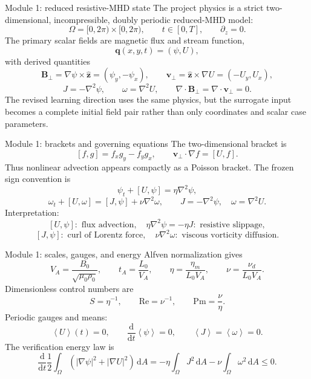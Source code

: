 \documentclass[aspectratio=169,11pt]{beamer}
\newcommand{\bracket}[2]{\left[#1,#2\right]}
\newcommand{\dd}{\,\mathrm{d}}
\newcommand{\avg}[1]{\left\langle #1\right\rangle}
\newcommand{\vect}[1]{\bm{#1}}
\newcommand{\OmegaD}{\Omega=[0,2\pi)\times[0,2\pi)}
\newcommand{\currentmodule}{Module 1}
\newcommand{\moduleprogress}{1 of 4}
\newcommand{\setmodule}[2]{%
  \renewcommand{\currentmodule}{#1}%
  \renewcommand{\moduleprogress}{#2}%
}
\begin{document}

\setmodule{Module 1}{1 of 4}
\begin{frame}[t]{Module 1: reduced resistive-MHD state}
\vspace{-0.15em}
The project physics is a strict two-dimensional, incompressible, doubly periodic reduced-MHD model:
\[
\OmegaD,\qquad t\in[0,T],\qquad \partial_z=0.
\]
The primary scalar fields are magnetic flux and stream function,
\[
\vect q(x,y,t)=(\psi,U),
\]
with derived quantities
\[
\vect B_\perp=\nabla\psi\times\widehat{\vect z}=(\psi_y,-\psi_x),\qquad
\vect v_\perp=\widehat{\vect z}\times\nabla U=(-U_y,U_x),
\]
\[
J=-\nabla^2\psi,\qquad \omega=\nabla^2U,
\qquad \nabla\cdot\vect B_\perp=\nabla\cdot\vect v_\perp=0.
\]
The revised learning direction uses the same physics, but the surrogate input becomes a complete initial field pair rather than only coordinates and scalar case parameters.
\end{frame}

\setmodule{Module 1}{2 of 4}
\begin{frame}[t]{Module 1: brackets and governing equations}
\vspace{-0.15em}
The two-dimensional bracket is
\[
\bracket{f}{g}=f_xg_y-f_yg_x,
\qquad
\vect v_\perp\cdot\nabla f=\bracket{U}{f}.
\]
Thus nonlinear advection appears compactly as a Poisson bracket. The frozen sign convention is
\[
\boxed{\psi_t+\bracket{U}{\psi}=\eta\nabla^2\psi,}
\]
\[
\boxed{\omega_t+\bracket{U}{\omega}=\bracket{J}{\psi}+\nu\nabla^2\omega,}
\qquad
J=-\nabla^2\psi,
\quad
\omega=\nabla^2U.
\]
Interpretation:
\[
\bracket{U}{\psi}:\text{ flux advection},\quad
\eta\nabla^2\psi=-\eta J:\text{ resistive slippage},
\]
\[
\bracket{J}{\psi}:\text{ curl of Lorentz force},\quad
\nu\nabla^2\omega:\text{ viscous vorticity diffusion}.
\]
\end{frame}

\setmodule{Module 1}{3 of 4}
\begin{frame}[t]{Module 1: scales, gauges, and energy}
\vspace{-0.15em}
Alfven normalization gives
\[
V_A=\frac{B_0}{\sqrt{\mu_0\rho_0}},
\qquad
 t_A=\frac{L_0}{V_A},
\qquad
\eta=\frac{\eta_m}{L_0V_A},
\qquad
\nu=\frac{\nu_d}{L_0V_A}.
\]
Dimensionless control numbers are
\[
S=\eta^{-1},\qquad \mathrm{Re}=\nu^{-1},\qquad \mathrm{Pm}=\frac{\nu}{\eta}.
\]
Periodic gauges and means:
\[
\avg{U}(t)=0,
\qquad
\frac{\mathrm d}{\mathrm dt}\avg{\psi}=0,
\qquad
\avg J=\avg\omega=0.
\]
The verification energy law is
\[
\boxed{\frac{\mathrm d}{\mathrm dt}\frac12\int_\Omega(|\nabla\psi|^2+|\nabla U|^2)\dd A
=-\eta\int_\Omega J^2\dd A-\nu\int_\Omega\omega^2\dd A\le0.}
\]
\end{frame}
\end{document}
